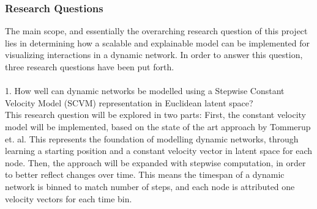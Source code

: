 \subsubsection{Research Questions} 
\label{sec:Intro:ResearchQs}
The main scope, and essentially the overarching research question of this project lies in determining how a scalable and explainable model can be implemented for visualizing interactions in a dynamic network.
In order to answer this question, three research questions have been put forth.
\\\\
\hspace*{5mm} 1. How well can dynamic networks be modelled using a Stepwise Constant Velocity Model (SCVM) representation in Euclidean latent space?
\\
This research question will be explored in two parts:
First, the constant velocity model will be implemented, based on the state of the art approach by Tommerup et. al. \cite{Tommerup2021LearningNetworks}
This represents the foundation of modelling dynamic networks, through learning a starting position and a constant velocity vector in latent space for each node.
Then, the approach will be expanded with stepwise computation, in order to better reflect changes over time.
This means the timespan of a dynamic network is binned to match number of steps, and each node is attributed one velocity vectors for each time bin.

